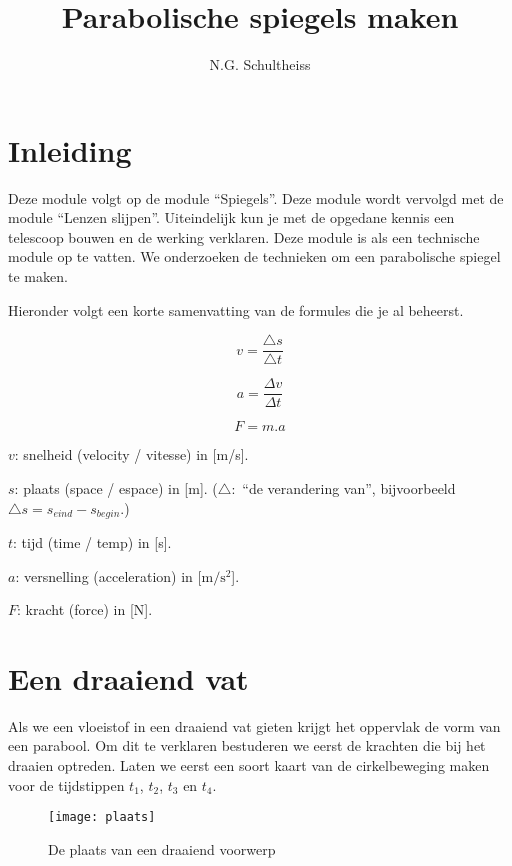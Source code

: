 



\title{Parabolische spiegels maken}
\author{N.G. Schultheiss}
\date{}

\maketitle
\thispagestyle{firststyle}

\section{Inleiding}

Deze module volgt op de module ``Spiegels''. Deze module wordt vervolgd
met de module ``Lenzen slijpen''. Uiteindelijk kun je met de opgedane
kennis een telescoop bouwen en de werking verklaren. Deze module is
als een technische module op te vatten. We onderzoeken de technieken
om een parabolische spiegel te maken.

Hieronder volgt een korte samenvatting van de formules die je al beheerst.

\[
v=\frac{\triangle s}{\triangle t}
\]


\[
a=\frac{\Delta v}{\Delta t}
\]


\[
F=m.a
\]


$v$: snelheid (velocity / vitesse) in {[}m/s{]}.

$s$: plaats (space / espace) in {[}m{]}. ($\triangle:$ ``de verandering
van'', bijvoorbeeld $\triangle s=s_{eind}-s_{begin}$.)

$t$: tijd (time / temp) in {[}s{]}.

$a$: versnelling (acceleration) in {[}$\mathrm{m/s^{2}}${]}.

$F$: kracht (force) in {[}N{]}.\newpage{}


\section{Een draaiend vat}

Als we een vloeistof in een draaiend vat gieten krijgt het oppervlak
de vorm van een parabool. Om dit te verklaren bestuderen we eerst
de krachten die bij het draaien optreden. Laten we eerst een soort
kaart van de cirkelbeweging maken voor de tijdstippen $t_{1}$, $t_{2}$,
$t_{3}$ en $t_{4}$.

\begin{figure}[H]
\noindent \begin{centering}
\texttt{[image: plaats]}
\par\end{centering}

\caption{De plaats van een draaiend voorwerp}
\end{figure}


